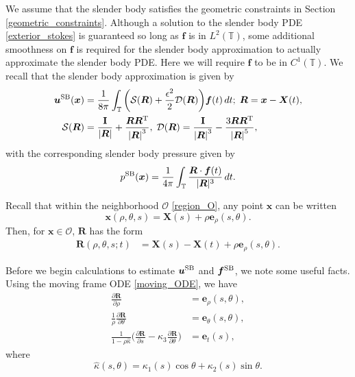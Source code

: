 \documentclass[11pt]{article}
\numberwithin{equation}{section}
\newcommand{\T}{\mathbb{T}}
\newcommand{\bu}{\bm{u}}
\newcommand{\bx}{\bm{x}}
\newcommand{\X}{\bm{X}}
\newcommand{\be}{\bm{e}}
\newcommand{\p}{\partial}
\newcommand{\ts}{\thinspace}
\newcommand{\SB}{{\rm SB}}
\newcommand{\abs}[1]{\left\lvert #1 \right\rvert}
\newcommand{\mc}[1]{\mathcal{#1}}
\theoremstyle{definition}
\begin{document}
We assume that the slender body satisfies the geometric constraints in Section \ref{geometric_constraints}. Although a solution to the slender body PDE \eqref{exterior_stokes} is guaranteed so long as ${\bm f}$ is in $L^2(\T)$, some additional smoothness on $\bm{f}$ is required for the slender body approximation to actually approximate the slender body PDE. Here we will require ${\bm f}$ to be in $C^1(\T)$. We recall that the slender body approximation is given by 
\begin{align}\label{stokes_SB}
\bu^{\SB}(\bx) &=\frac{1}{8\pi}\int_{\T} \bigg( \mc{S}(\bm{R})+\frac{\epsilon^2}{2}\mc{D}(\bm{R}) \bigg)\bm{f}(t) \ts dt; \; 
\bm{R}=\bm{x}-\bm{X}(t),\\
\label{SD}
\mc{S}(\bm{R})&=\frac{{\bf I}}{\abs{\bm{R}}}+\frac{\bm{R}\bm{R}^{\rm T}}{\abs{\bm{R}}^3}, \; 
\mc{D}(\bm{R})=\frac{{\bf I}}{\abs{\bm{R}}^3}-\frac{3\bm{R}\bm{R}^{\rm T}}{\abs{\bm{R}}^5},
\end{align}
with the corresponding slender body pressure given by
\begin{equation}\label{SB_pressure}
p^{\SB}(\bx) = \frac{1}{4\pi}\int_{\T} \frac{\bm{R}\cdot {\bm f}(t)}{|\bm{R}|^3} \ts dt. 
\end{equation}

Recall that within the neighborhood $\mathcal{O}$ \eqref{region_O}, any point $\bx$ can be written
\[\bx(\rho,\theta,s) = \X(s)+\rho \be_{\rho}(s,\theta).\]
Then, for $\bx\in \mathcal{O}$, $\bm{R}$ has the form 
\begin{align*}
\bm{R}(\rho,\theta,s;t) &= \X(s)- \X(t) + \rho \be_{\rho}(s,\theta).
\end{align*}

Before we begin calculations to estimate $\bu^{\SB}$ and $\bm{f}^{\SB}$, we note some useful facts. Using the moving frame ODE \eqref{moving_ODE}, we have 
\begin{align}
\frac{\p \bm{R}}{\p \rho}&=\be_\rho(s,\theta), \label{rhoderiv}\\
\frac{1}{\rho}\frac{\p \bm{R}}{\p \theta}&=\be_\theta(s,\theta),\label{thetaderiv}\\
\frac{1}{1-\rho\widehat{\kappa}}\bigg(\frac{\p \bm{R}}{\p s}-\kappa_3 \frac{\p \bm{R}}{\p \theta}\bigg) &=\be_t(s), \label{sderiv}
\end{align}
where 
\begin{equation}\label{kappahat}
\widehat{\kappa}(s,\theta)=\kappa_1(s)\cos\theta+\kappa_2(s)\sin\theta.
\end{equation}
\end{document}
